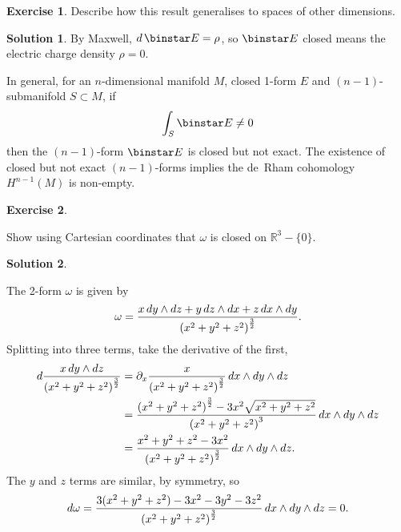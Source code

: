 \documentclass[11pt, a4paper]{report}
\theoremstyle{definition}
\newtheorem{exercise}{Exercise}[part]
\newtheorem{solution}{Solution}[part]
\newenvironment{ex}{\begin{exercise}}{\end{exercise}\pagebreak[1]}
\newenvironment{sol}{\begin{solution}}{\end{solution}\pagebreak[3]}
\newcommand*{\op}[1]{\ensuremath\mathop{}\mathopen{}#1}
\renewcommand*{\d}{\op{d}}
\renewcommand*{\star}{\op{\binstar}\mathord{}}
\begin{document}
\begin{ex}

Describe how this result generalises to spaces of other dimensions.

\end{ex}

\begin{sol}

By Maxwell, $d \star E = \rho$, so $\star E$ closed means the electric charge density $\rho = 0$.

In general, for an $n$-dimensional manifold $M$, closed 1-form $E$ and $(n - 1)$-submanifold $S \subset M$, if
\[
    \int_S \star E \neq 0
\]
then the $(n-1)$-form $\star E$ is closed but not exact.
The existence of closed but not exact $(n - 1)$-forms implies the de~Rham cohomology $H^{n - 1}(M)$ is non-empty.

\end{sol}

\begin{ex}\label{ex:closedbutnotexact2form}

Show using Cartesian coordinates that $\omega$ is closed on $\mathbb{R}^3 - \{0\}$.

\end{ex}

\begin{sol}\label{sol:closedbutnotexact2form}

The 2-form $\omega$ is given by
\[
    \omega = \frac{x \d y \wedge dz + y \d z \wedge dx + z \d x \wedge dy}{{(x^2 + y^2 + z^2)}^\frac{3}{2}}.
\]
Splitting into three terms, take the derivative of the first,
\begin{align*}
    d \frac{x \d y \wedge dz}{{(x^2 + y^2 + z^2)}^\frac{3}{2}}
        &= \partial_x \frac{x}{{(x^2 + y^2 + z^2)}^\frac{3}{2}} \d x \wedge dy \wedge dz \\
        &= \frac{{(x^2 + y^2 + z^2)}^\frac{3}{2} - 3x^2 \sqrt{x^2 + y^2 + z^2}}{{(x^2 + y^2 + z^2)}^3} \d x \wedge dy \wedge dz \\
        &= \frac{x^2 + y^2 + z^2 - 3x^2}{{(x^2 + y^2 + z^2)}^\frac{3}{2}} \d x \wedge dy \wedge dz.
\end{align*}
The $y$ and $z$ terms are similar, by symmetry,
so
\[
    d\omega = \frac{3(x^2 + y^2 + z^2) - 3x^2 - 3y^2 - 3z^2}{{(x^2 + y^2 + z^2)}^\frac{3}{2}} \d x \wedge dy \wedge dz = 0.
\]

\end{sol}
\end{document}
